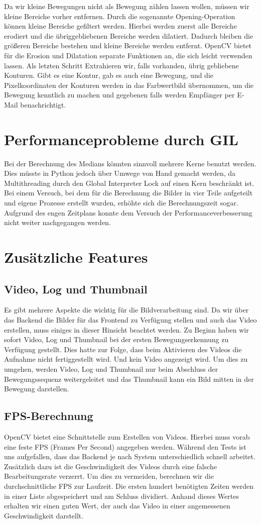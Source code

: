Da wir kleine Bewegungen nicht als Bewegung zählen lassen wollen, müssen wir kleine Bereiche vorher entfernen. Durch die sogenannte Opening-Operation können kleine Bereiche gefiltert werden. Hierbei werden zuerst alle Bereiche erodiert und die übriggebliebenen Bereiche werden dilatiert. Dadurch bleiben die größeren Bereiche bestehen und kleine Bereiche werden entfernt. OpenCV bietet für die Erosion und Dilatation separate Funktionen an, die sich leicht verwenden lassen.
Als letzten Schritt Extrahieren wir, falls vorhanden, übrig gebliebene Konturen. Gibt es eine Kontur, gab es auch eine Bewegung, und die Pixelkoordinaten der Konturen werden in das Farbwertbild übernommen, um die Bewegung kenntlich zu machen und gegebenen falls werden Empfänger per E-Mail benachrichtigt.
\section{Performanceprobleme durch GIL}
Bei der Berechnung des Medians könnten sinnvoll mehrere Kerne benutzt werden. Dies müsste in Python jedoch über Umwege von Hand gemacht werden, da Multithreading durch den Global Interpreter Lock auf einen Kern beschränkt ist. Bei einem Versuch, bei dem für die Berechnung die Bilder in vier Teile aufgeteilt und eigene Prozesse erstellt wurden, erhöhte sich die Berechnungszeit sogar. Aufgrund des engen Zeitplans konnte dem Versuch der Performanceverbesserung nicht weiter nachgegangen werden.
\section{Zusätzliche Features}
\subsection{Video, Log und Thumbnail}
Es gibt mehrere Aspekte die wichtig für die Bildverarbeitung sind. Da wir über das Backend die Bilder für das Frontend zu Verfügung stellen und auch das Video erstellen, muss einiges in dieser Hinsicht beachtet werden. Zu Beginn haben wir sofort Video, Log und Thumbnail bei der ersten Bewegungserkennung zu Verfügung gestellt. Dies hatte zur Folge, dass beim Aktivieren des Videos die Aufnahme nicht fertiggestellt wird. Und kein Video angezeigt wird. Um dies zu umgehen, werden Video, Log und Thumbnail nur beim Abschluss der Bewegungssequenz weitergeleitet und das Thumbnail kann ein Bild mitten in der Bewegung darstellen.
\subsection{FPS-Berechnung}
OpenCV bietet eine Schnittstelle zum Erstellen von Videos. Hierbei muss vorab eine feste FPS (Frames Per Second) angegeben werden. Während den Tests ist uns aufgefallen, dass das Backend je nach System unterschiedlich schnell arbeitet. Zusätzlich dazu ist die Geschwindigkeit des Videos durch eine falsche Bearbeitungsrate verzerrt. Um dies zu vermeiden, berechnen wir die durchschnittliche FPS zur Laufzeit. Die ersten hundert benötigten Zeiten werden in einer Liste abgespeichert und am Schluss dividiert. Anhand dieses Wertes erhalten wir einen guten Wert, der auch das Video in einer angemessenen Geschwindigkeit darstellt.
